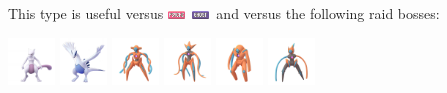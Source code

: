 \documentclass[12pt]{beamer}
\newcommand{\ghostfull}{\includegraphics[height=0.2cm]{../../images/type/full/Ghost.png}}
\newcommand{\psychicfull}{\includegraphics[height=0.2cm]{../../images/type/full/Psychic.png}}
\begin{document}
\begin{frame}
\begin{scriptsize}
\bigskip

\begin{block}{}\begin{center}
This type is useful versus \psychicfull~\ghostfull~and versus the following raid bosses:

    \includegraphics[width=1.25cm]{../../images/pokemon/mewtwo.png}
    \includegraphics[width=1.25cm]{../../images/pokemon/lugia.png}
    \includegraphics[width=1.25cm]{../../images/pokemon/deoxys_n.png}
    \includegraphics[width=1.25cm]{../../images/pokemon/deoxys_a.png}
    \includegraphics[width=1.25cm]{../../images/pokemon/deoxys_d.png}
    \includegraphics[width=1.25cm]{../../images/pokemon/deoxys_s.png}
    

\end{center}
\end{block}
\end{scriptsize}
\end{frame}
\end{document}
